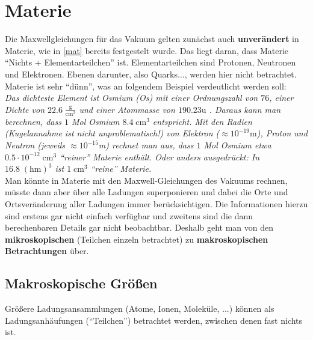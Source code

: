  \section{Materie}\label{materie}
		   Die Maxwellgleichungen für das Vakuum gelten zunächst auch \textbf{unverändert} in Materie, wie in \ref{mat} bereits festgestelt wurde. Das liegt daran, dass Materie \enquote{Nichts + Elementarteilchen} ist. Elementarteilchen sind Protonen, Neutronen und Elektronen. Ebenen darunter, also Quarks..., werden hier nicht betrachtet. Materie ist sehr \enquote{dünn}, was an folgendem Beispiel verdeutlicht werden soll:\\
			         \textit{Das dichteste Element ist {Osmium} (Os) mit einer Ordnungszahl von $76$, einer Dichte von $22.6\; \frac{\mathrm{g}}{\mathrm{cm}^3}$ und einer Atommasse von $190.23 \mathrm{u}$ . Daraus kann man berechnen, dass $1$ Mol Osmium $8.4\; \mathrm{cm}^3$ entspricht.
			         Mit den Radien (Kugelannahme ist nicht unproblematisch!) von Elektron ($\approx 10^{-19}\mathrm{m}$), Proton und Neutron (jeweils $\approx 10^{-15}$\;m) rechnet man aus, dass $1$ Mol Osmium etwa $0.5\cdot 10^{-12}\;\mathrm{cm}^3$ \enquote{reiner} Materie enthält.
			         Oder anders ausgedrückt: In $16.8\;(\mathrm{hm})^3$ ist $1\;\mathrm{cm}^3$ \enquote{reine} Materie.}\\
		   Man könnte in Materie mit den Maxwell-Gleichungen des Vakuums rechnen, müsste dann aber über alle Ladungen superponieren und dabei die Orte und Ortsveränderung aller Ladungen immer berücksichtigen. Die Informationen hierzu sind erstens gar nicht einfach verfügbar und zweitens sind die dann berechenbaren Details gar nicht beobachtbar. Deshalb geht man von den \textbf{mikroskopischen} (Teilchen einzeln betrachtet) zu \textbf{makroskopischen Betrachtungen} über. 
  \subsection{Makroskopische Größen}
  Größere Ladungsansammlungen (Atome, Ionen, Moleküle, ...) können als Ladungsanhäufungen (\enquote{Teilchen}) betrachtet werden, zwischen denen fast nichts ist.
